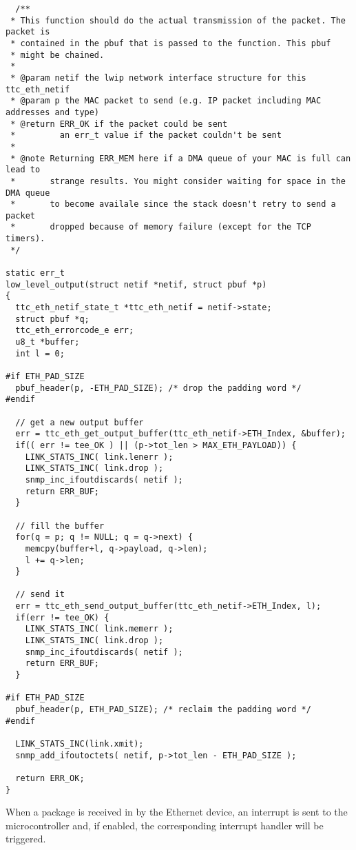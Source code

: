 \begin{lstlisting}
  /**
 * This function should do the actual transmission of the packet. The packet is
 * contained in the pbuf that is passed to the function. This pbuf
 * might be chained.
 *
 * @param netif the lwip network interface structure for this ttc_eth_netif
 * @param p the MAC packet to send (e.g. IP packet including MAC addresses and type)
 * @return ERR_OK if the packet could be sent
 *         an err_t value if the packet couldn't be sent
 *
 * @note Returning ERR_MEM here if a DMA queue of your MAC is full can lead to
 *       strange results. You might consider waiting for space in the DMA queue
 *       to become availale since the stack doesn't retry to send a packet
 *       dropped because of memory failure (except for the TCP timers).
 */

static err_t
low_level_output(struct netif *netif, struct pbuf *p)
{
  ttc_eth_netif_state_t *ttc_eth_netif = netif->state;
  struct pbuf *q;
  ttc_eth_errorcode_e err;
  u8_t *buffer;
  int l = 0;
  
#if ETH_PAD_SIZE
  pbuf_header(p, -ETH_PAD_SIZE); /* drop the padding word */
#endif

  // get a new output buffer
  err = ttc_eth_get_output_buffer(ttc_eth_netif->ETH_Index, &buffer);
  if(( err != tee_OK ) || (p->tot_len > MAX_ETH_PAYLOAD)) {
    LINK_STATS_INC( link.lenerr );
    LINK_STATS_INC( link.drop );
    snmp_inc_ifoutdiscards( netif );
    return ERR_BUF;
  }
  
  // fill the buffer
  for(q = p; q != NULL; q = q->next) {
    memcpy(buffer+l, q->payload, q->len);
    l += q->len;
  }

  // send it
  err = ttc_eth_send_output_buffer(ttc_eth_netif->ETH_Index, l);
  if(err != tee_OK) {
    LINK_STATS_INC( link.memerr );
    LINK_STATS_INC( link.drop );
    snmp_inc_ifoutdiscards( netif );
    return ERR_BUF;
  }
  
#if ETH_PAD_SIZE
  pbuf_header(p, ETH_PAD_SIZE); /* reclaim the padding word */
#endif

  LINK_STATS_INC(link.xmit);
  snmp_add_ifoutoctets( netif, p->tot_len - ETH_PAD_SIZE );
  
  return ERR_OK;
}
\end{lstlisting}




When a package is received in by the Ethernet device, an interrupt is sent to the microcontroller and, if enabled, the corresponding interrupt handler will be triggered.

